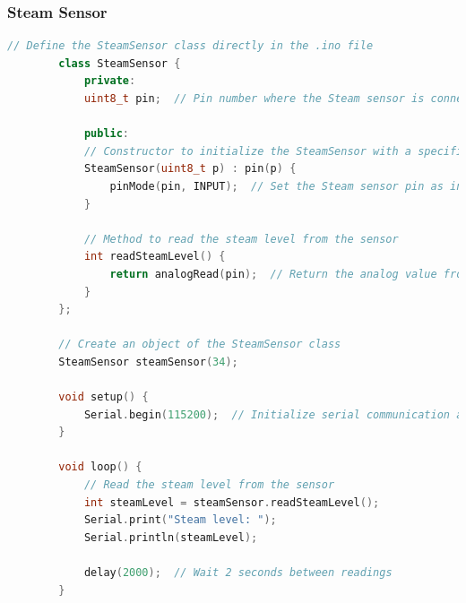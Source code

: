 \documentclass[12pt,a4paper]{book}
\begin{document}
	\subsubsection*{Steam Sensor}
	\begin{lstlisting}[language=C++]
		// Define the SteamSensor class directly in the .ino file
		class SteamSensor {
			private:
			uint8_t pin;  // Pin number where the Steam sensor is connected
			
			public:
			// Constructor to initialize the SteamSensor with a specific pin
			SteamSensor(uint8_t p) : pin(p) {
				pinMode(pin, INPUT);  // Set the Steam sensor pin as input
			}
			
			// Method to read the steam level from the sensor
			int readSteamLevel() {
				return analogRead(pin);  // Return the analog value from the sensor
			}
		};
		
		// Create an object of the SteamSensor class
		SteamSensor steamSensor(34);
		
		void setup() {
			Serial.begin(115200);  // Initialize serial communication at 115200 baud rate
		}
		
		void loop() {
			// Read the steam level from the sensor
			int steamLevel = steamSensor.readSteamLevel();
			Serial.print("Steam level: ");
			Serial.println(steamLevel);
			
			delay(2000);  // Wait 2 seconds between readings
		}
	\end{lstlisting}
	\clearpage
\end{document}
